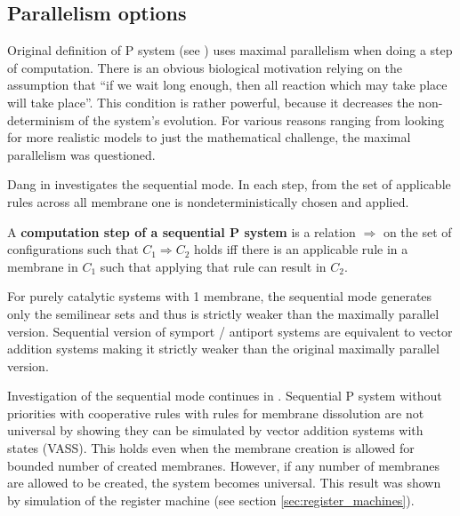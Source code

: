 
\subsection{Parallelism options} %
\label{sub:parallelism_options}

Original definition of P system (see \cite{Paun98}) uses maximal parallelism when doing a step of computation. There is an obvious biological motivation relying on the assumption that ``if we wait long enough, then all reaction which may take place will take place''. This condition is rather powerful, because it decreases the non-determinism of the system's evolution. For various reasons ranging from looking for more realistic models to just the mathematical challenge, the maximal parallelism was questioned.


Dang in \cite{Dang04Sequential} investigates the sequential mode. In each step, from the set of applicable rules across all membrane one is nondeterministically chosen and applied.

\begin{definition}
  \label{def:computation_step_of_a_sequential_P_system}
  A {\bf computation step of a sequential P system} is a relation $\Rightarrow$ on the set of configurations such that $C_1 \Rightarrow C_2$ holds iff there is an applicable rule in a membrane in $C_1$ such that applying that rule can result in $C_2$.
\end{definition}

For purely catalytic systems with 1 membrane, the sequential mode generates only the semilinear sets and thus is strictly weaker than the maximally parallel version.
Sequential version of symport / antiport systems are equivalent to vector addition systems making it strictly weaker than the original maximally parallel version.

Investigation of the sequential mode continues in \cite{Ibarra05Active}. Sequential P system without priorities with cooperative rules with rules for membrane dissolution are not universal by showing they can be simulated by vector addition systems with states (VASS).
This holds even when the membrane creation is allowed for bounded number of created membranes. However, if any number of membranes are allowed to be created, the system becomes universal. This result was shown by simulation of the register machine (see section \ref{sec:register_machines}).

